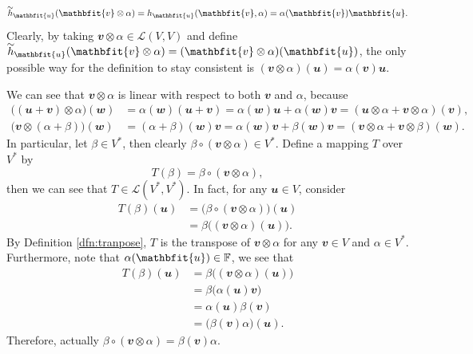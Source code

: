 \documentclass[math]{amznotes}
\renewcommand\widetilde[1]{\ThisStyle{%
  \setbox0=\hbox{$\SavedStyle#1$}%
  \stackengine{1pt-\LMpt}{$\SavedStyle#1$}{%
    \stretchto{\scaleto{\SavedStyle\mkern.2mu\sim}{.5467\wd0}}{.5\ht0}%
  }{O}{c}{F}{T}{S}%
}}
\theoremstyle{remark}
\begin{document}
\begin{equation*}
    \widetilde{h}_{\mathbfit{u}}(\mathbfit{v} \otimes \alpha) = h_{\mathbfit{u}}(\mathbfit{v}, \alpha) = \alpha(\mathbfit{v})\mathbfit{u}.
\end{equation*}
Clearly, by taking $\mathbfit{v} \otimes \alpha \in \mathcal{L}(V, V)$ and define $\widetilde{h}_{\mathbfit{u}}(\mathbfit{v} \otimes \alpha) = (\mathbfit{v} \otimes \alpha)(\mathbfit{u})$, the only possible way for the definition to stay consistent is $(\mathbfit{v} \otimes \alpha)(\mathbfit{u}) = \alpha(\mathbfit{v})\mathbfit{u}$.

We can see that $\mathbfit{v} \otimes \alpha$ is linear with respect to both $\mathbfit{v}$ and $\alpha$, because
\begin{align*}
    \bigl((\mathbfit{u + v}) \otimes \alpha\bigr)(\mathbfit{w}) & = \alpha(\mathbfit{w})(\mathbfit{u + v}) = \alpha(\mathbfit{w})\mathbfit{u} + \alpha(\mathbfit{w})\mathbfit{v} = (\mathbfit{u} \otimes \alpha + \mathbfit{v} \otimes \alpha)(\mathbfit{v}), \\
    \bigl(\mathbfit{v} \otimes (\alpha + \beta)\bigr)(\mathbfit{w}) & = (\alpha + \beta)(\mathbfit{w})\mathbfit{v} = \alpha(\mathbfit{w})\mathbfit{v} + \beta(\mathbfit{w})\mathbfit{v} = (\mathbfit{v} \otimes \alpha + \mathbfit{v} \otimes \beta)(\mathbfit{w}).
\end{align*}
In particular, let $\beta \in V^*$, then clearly $\beta \circ (\mathbfit{v} \otimes \alpha) \in V^*$. Define a mapping $T$ over $V^*$ by
\begin{equation*}
    T(\beta) = \beta \circ (\mathbfit{v} \otimes \alpha),
\end{equation*}
then we can see that $T \in \mathcal{L}\left(V^*, V^*\right)$. In fact, for any $\mathbfit{u} \in V$, consider
\begin{align*}
    T(\beta)(\mathbfit{u}) & = \bigl(\beta \circ (\mathbfit{v} \otimes \alpha)\bigr)(\mathbfit{u}) \\
    & = \beta\bigl((\mathbfit{v} \otimes \alpha)(\mathbfit{u})\bigr).
\end{align*}
By Definition \ref{dfn:tranpose}, $T$ is the transpose of $\mathbfit{v} \otimes \alpha$ for any $\mathbfit{v} \in V$ and $\alpha \in V^*$. Furthermore, note that $\alpha(\mathbfit{u}) \in \F$, we see that
\begin{align*}
    T(\beta)(\mathbfit{u}) & = \beta\bigl((\mathbfit{v} \otimes \alpha)(\mathbfit{u})\bigr) \\
    & = \beta\bigl(\alpha(\mathbfit{u})\mathbfit{v}\bigr) \\
    & = \alpha(\mathbfit{u})\beta(\mathbfit{v}) \\
    & = \bigl(\beta(\mathbfit{v})\alpha\bigr)(\mathbfit{u}).
\end{align*}
Therefore, actually $\beta \circ (\mathbfit{v} \otimes \alpha) = \beta(\mathbfit{v})\alpha$.
\end{document}
